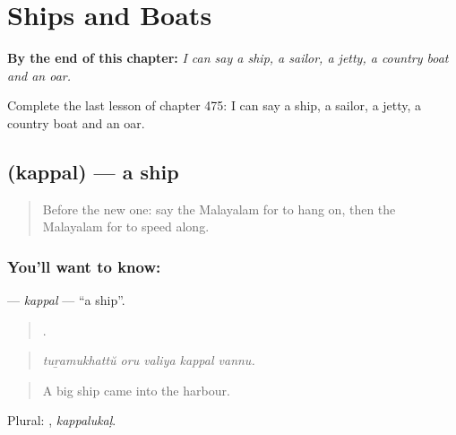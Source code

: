 
\chapter{Ships and Boats}
\label{ch:ml-ships-and-boats}

\begin{chapteropening}
\textbf{By the end of this chapter:} \emph{I can say a ship, a sailor, a jetty, a country boat and an oar.}

Complete the last lesson of chapter 475: I can say a ship, a sailor, a jetty, a country boat and an oar.
\end{chapteropening}

\section[\texorpdfstring{\ml{കപ്പൽ} (kappal)}{കപ്പൽ (kappal)}]{ (kappal) — a ship}

\label{lesson:ML-C475-kappal}



\begin{quote}
Before the new one: say the Malayalam for to hang on, then the Malayalam for to speed along.
\end{quote}

\subsection*{You'll want to know: }
\textbf{} — \emph{kappal} — \textquotedblleft{}a ship\textquotedblright{}.

\begin{quote}
    .
\end{quote}

\begin{quote}
\emph{tuṟamukhattŭ oru valiya kappal vannu.}
\end{quote}

\begin{quote}
A big ship came into the harbour.
\end{quote}

Plural: , \emph{kappalukaḷ}.

